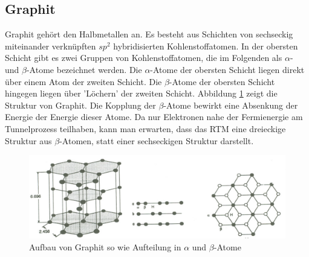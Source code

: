\subsection{Graphit}
Graphit gehört den Halbmetallen an. Es besteht aus Schichten von sechseckig
miteinander verknüpften $sp^2$ hybridisierten Kohlenstoffatomen. In der obersten Schicht gibt es zwei Gruppen von Kohlenstoffatomen, die im Folgenden als $\alpha$-
und $\beta$-Atome bezeichnet werden. Die $\alpha$-Atome der obersten Schicht liegen direkt
über einem Atom der zweiten Schicht. Die $\beta$-Atome der obersten Schicht
hingegen liegen über  'Löchern' der zweiten Schicht. Abbildung \ref{Graphit} zeigt die Struktur von Graphit. Die Kopplung der $\beta$-Atome
bewirkt eine Absenkung der Energie der Energie dieser Atome. Da nur Elektronen
nahe der Fermienergie am Tunnelprozess teilhaben, kann man erwarten,
dass das RTM eine dreieckige Struktur aus $\beta$-Atomen, statt einer sechseckigen
Struktur darstellt.
\begin{figure}[ht]
	\includegraphics[scale=0.9]{Bild/Graphit}
	\centering
	\caption[Graphit]{Aufbau von Graphit so wie Aufteilung in $\alpha$ und $\beta$-Atome}
	\label{Graphit}
\end{figure}
